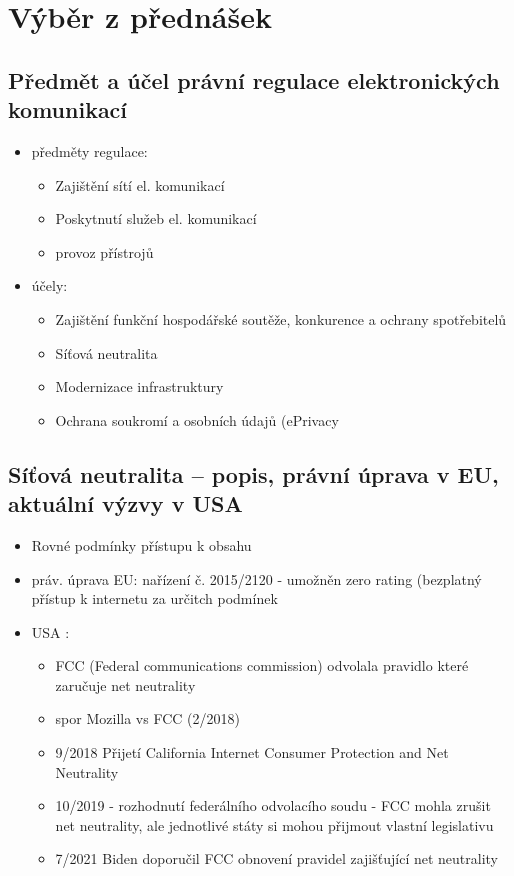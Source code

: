 \section{Výběr z přednášek}

\subsection{Předmět a účel právní regulace elektronických komunikací}
\begin{itemize}
    \item předměty regulace:
    \begin{itemize}
        \item Zajištění sítí el. komunikací
        \item Poskytnutí služeb el. komunikací
        \item provoz přístrojů
    \end{itemize}
    \item účely:
    \begin{itemize}
        \item Zajištění funkční hospodářské soutěže, konkurence a ochrany spotřebitelů
        \item Síťová neutralita
        \item Modernizace infrastruktury
        \item Ochrana soukromí a osobních údajů (ePrivacy
    \end{itemize}
\end{itemize}


\subsection{Síťová neutralita -- popis, právní úprava v EU, aktuální výzvy v USA}
\begin{itemize}
    \item Rovné podmínky přístupu k obsahu
    \item práv. úprava EU: nařízení č. 2015/2120 - umožněn zero rating (bezplatný přístup k internetu za určitch podmínek
    \item USA : \begin{itemize}
        \item  FCC (Federal communications commission) odvolala pravidlo které zaručuje net neutrality
        \item spor Mozilla vs FCC (2/2018)
        \item 9/2018 Přijetí California Internet Consumer Protection and Net Neutrality
        \item 10/2019 - rozhodnutí federálního odvolacího soudu - FCC mohla zrušit net neutrality, ale jednotlivé státy si mohou přijmout vlastní legislativu
        \item 7/2021 Biden doporučil FCC obnovení pravidel zajišťující net neutrality
    \end{itemize}
\end{itemize}


